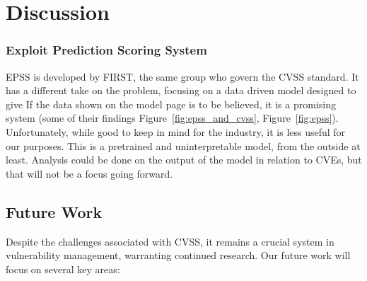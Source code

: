 \documentclass[12pt]{article}
\begin{document}
\section{Discussion}\label{discussion}


\subsubsection{Exploit Prediction Scoring System}

EPSS is developed by FIRST, the same group who govern the CVSS standard. It has a different take
on the problem, focusing on a data driven model designed to give  If the data shown on the model
page is to be believed, it is a promising system (some of their findings Figure~\ref{fig:epss_and_cvss},
Figure~\ref{fig:epss}). Unfortunately, while good to keep in mind for the industry, it is less useful
for our purposes. This is a pretrained and uninterpretable model, from the outside at least.
Analysis could be done on the output of the model in relation to CVEs, but that will not be a focus
going forward.


\subsection{Future Work}

Despite the challenges associated with CVSS, it remains a crucial system in vulnerability
management, warranting continued research. Our future work will focus on several key areas:
\end{document}
